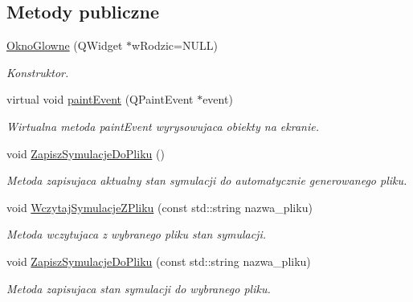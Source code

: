 \subsection*{Metody publiczne}
\begin{DoxyCompactItemize}
\item 
\hyperlink{class_okno_glowne_a8dcfe4e0f18dfaf0c535c4549991b550}{Okno\-Glowne} (Q\-Widget $\ast$w\-Rodzic=N\-U\-L\-L)
\begin{DoxyCompactList}\small\item\em Konstruktor. \end{DoxyCompactList}\item 
virtual void \hyperlink{class_okno_glowne_a570c795e3829c3bd7896551c0624abe2}{paint\-Event} (Q\-Paint\-Event $\ast$event)
\begin{DoxyCompactList}\small\item\em Wirtualna metoda paint\-Event wyrysowujaca obiekty na ekranie. \end{DoxyCompactList}\item 
void \hyperlink{class_okno_glowne_a6062f76fdf15ad8bc0543cfd2a2fe150}{Zapisz\-Symulacje\-Do\-Pliku} ()
\begin{DoxyCompactList}\small\item\em Metoda zapisujaca aktualny stan symulacji do automatycznie generowanego pliku. \end{DoxyCompactList}\item 
void \hyperlink{class_okno_glowne_a1b8098c27e9656235bb056aeb79a8ece}{Wczytaj\-Symulacje\-Z\-Pliku} (const std\-::string nazwa\-\_\-pliku)
\begin{DoxyCompactList}\small\item\em Metoda wczytujaca z wybranego pliku stan symulacji. \end{DoxyCompactList}\item 
void \hyperlink{class_okno_glowne_ac57587eba95f28512d71705a87f8a508}{Zapisz\-Symulacje\-Do\-Pliku} (const std\-::string nazwa\-\_\-pliku)
\begin{DoxyCompactList}\small\item\em Metoda zapisujaca stan symulacji do wybranego pliku. \end{DoxyCompactList}\end{DoxyCompactItemize}
